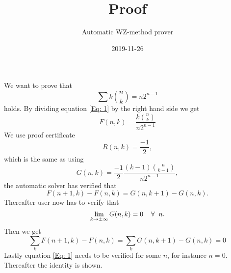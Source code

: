 \documentclass{article}
\title{Proof}
\author{Automatic WZ-method prover}
\date{2019-11-26}
\let\oldforall\forall
\renewcommand{\forall}{\hspace*{2mm}\oldforall\hspace*{1mm}}
\begin{document}
\maketitle
We want to prove that
\begin{equation}\label{Eq: 1}
\sum k\binom{n}{k} = n2^{n-1}
\end{equation}
holds. By dividing equation \ref{Eq: 1} by the right hand side we get
\begin{equation}
F(n,k)=\frac{k\binom{n}{k}}{n2^{n-1}}
\end{equation}
We use proof certificate
\begin{equation}
R(n,k)=\frac{-1}{2},
\end{equation}
which is the same as using
\begin{equation}
G(n,k)=\frac{-1}{2}\frac{(k-1)\binom{n}{k-1}}{n2^{n-1}},
\end{equation}
the automatic solver has  verified that
\begin{equation}\label{Eq: WZ1}
F(n+1,k)-F(n,k)=G(n,k+1)-G(n,k).
\end{equation}
Thereafter user now has to verify that
\begin{equation}
\lim_{k\to\pm\infty}G(n,k)=0\forall n.
\end{equation}
Then we get
\begin{equation}
\sum_k F(n+1,k)-F(n,k)=\sum_k G(n,k+1)-G(n,k)=0\end{equation}Lastly equation \ref{Eq: 1} needs to be verified for some $n$, for instance $n=0$. Thereafter the identity is shown.
\end{document}
